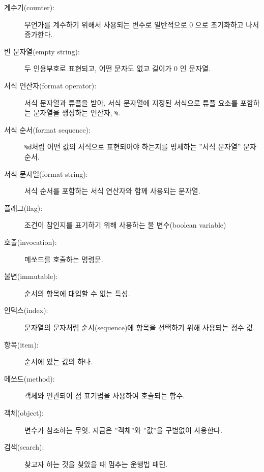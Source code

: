 \begin{description}

\item[계수기(counter):] 무언가를 계수하기 위해서 사용되는 변수로 일반적으로 0 으로 초기화하고 나서 증가한다.

\item[빈 문자열(empty string):] 두 인용부호로 표현되고, 어떤 문자도 없고 길이가 0 인 문자열.

\item[서식 연산자(format operator):] 서식 문자열과 튜플을 받아, 서식 문자열에 지정된 서식으로 튜플 요소를 포함하는 문자열을 생성하는 연산자, {\tt \%}.

\item[서식 순서(format sequence):] {\tt \%d}처럼 어떤 값의 서식으로 표현되어야 하는지를 명세하는 ''서식 문자열'' 문자 순서. 

\item[서식 문자열(format string):] 서식 순서를 포함하는 서식 연산자와 함께 사용되는 문자열.

\item[플래그(flag):] 조건이 참인지를 표기하기 위해 사용하는 불 변수(boolean variable)

\item[호출(invocation):] 메쏘드를 호출하는 명령문.

\item[불변(immutable):] 순서의 항목에 대입할 수 없는 특성.

\item[인덱스(index):] 문자열의 문자처럼 순서(sequence)에 항목을 선택하기 위해 사용되는 정수 값.

\item[항목(item):] 순서에 있는 값의 하나.

\item[메쏘드(method):] 객체와 연관되어 점 표기법을 사용하여 호출되는 함수.

\item[객체(object):] 변수가 참조하는 무엇. 지금은 ''객체''와 ''값''을 구별없이 사용한다.

\item[검색(search):] 찾고자 하는 것을 찾았을 때 멈추는 운행법 패턴.


\end{description}
